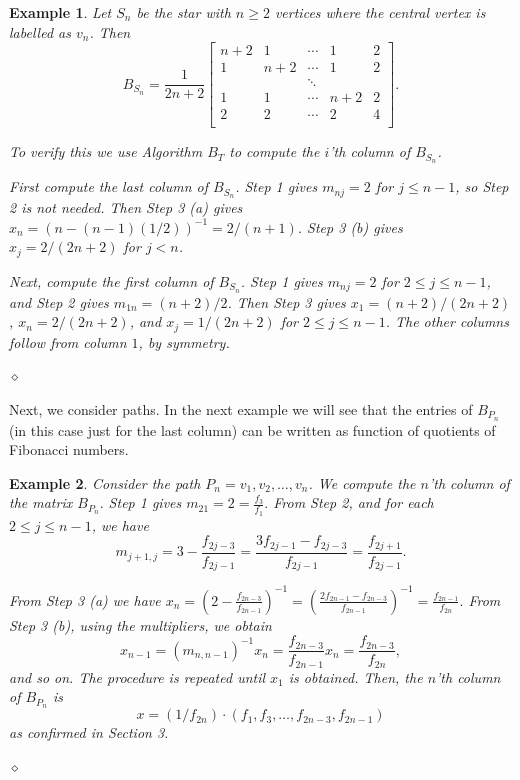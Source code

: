 \documentclass[12pt]{article}
\newtheorem{example}{Example}
\begin{document}
\begin{example}
{\rm    Let $S_n$ be the star with $n\geq 2$ vertices where the central vertex is labelled as $v_n$. Then  
    \begin{equation}\label{starinverse}
  B_{S_n}= \frac{1}{2n+2}\left[
  \begin{array}{ccccc}
    n+2& 1&\cdots& 1& 2 \\
   1& n+2&\cdots& 1& 2 \\
    && \ddots \\
    1& 1 &\cdots& n+2& 2 \\
   2& 2&\cdots& 2& 4 \\
  \end{array}
  \right].
  \end{equation}

To verify this we use Algorithm $B_T$ to compute the $i$'th column of $B_{S_n}$. 

First compute the last column of $B_{S_n}$. Step 1 gives $m_{nj}=2$ for $j\le n-1$, so Step 2 is not needed. Then Step 3 (a) gives  $x_n= (n-(n-1)(1/2))^{-1}= 2/ (n+1)$. Step 3 (b) gives $x_j=2/(2n+2)$ for $j<n$. 

Next,  compute the first column of $B_{S_n}$. Step 1 gives $m_{nj}=2$ for $2\le j \le n-1$, and Step 2 gives $m_{1n}=(n+2)/2$. Then Step 3 gives $x_1=(n+2)/(2n+2)$,  $x_n=2/(2n+2)$, and $x_j=1/(2n+2)$ for $2 \le j \le n-1$.
The other columns follow from column $1$, by symmetry.
}\hfill{$\diamond$}
\end{example}

Next, we consider paths. In the next example we will see that the entries of $B_{P_n}$ (in this case just for the last column) can be written as function of quotients of Fibonacci numbers.


\begin{example}
{\rm 
 Consider the path $P_n=v_1, v_2, \ldots, v_n$. We compute the $n$'th column of the matrix $B_{P_n}.$  
Step 1 gives $m_{21}= 2=\frac{f_3}{f_1}.$
From Step 2, and 
for each $2\leq j\leq n-1$, we have 
$$m_{j+1, j} = 3- \frac{f_{2j-3}}{f_{2j -1}}= \frac{3f_{2j-1}- f_{2j-3}}{f_{2j-1}} = \frac{f_{2j+1}}{f_{2j-1}}.$$

From Step 3 (a) we have 
$x_n = ( 2 - \frac{f_{2n-3}}{f_{2n-1}})^{-1}=( \frac{2 f_{2n-1} -f_{2n-3}}{f_{2n-1}})^{-1} =\frac{f_{2n-1}}{f_{2n}}.$
From Step 3 (b), using the multipliers, we obtain $$x_{n-1}=(m_{n,n-1})^{-1} x_n =\frac{f_{2n-3}}{f_{2n-1}}x_{n}=\frac{f_{2n-3}}{f_{2n}},$$ and so on. The procedure is repeated until $x_1$ is obtained. 
Then, the $n$'th column of $B_{P_n}$ is 
\[
x= (1/f_{2n}) \cdot   (f_1, f_3,\ldots , f_{2n-3}, f_{2n-1})    
\] 
as confirmed in Section 3.
}\hfill{$\diamond$}
\end{example}
\end{document}
